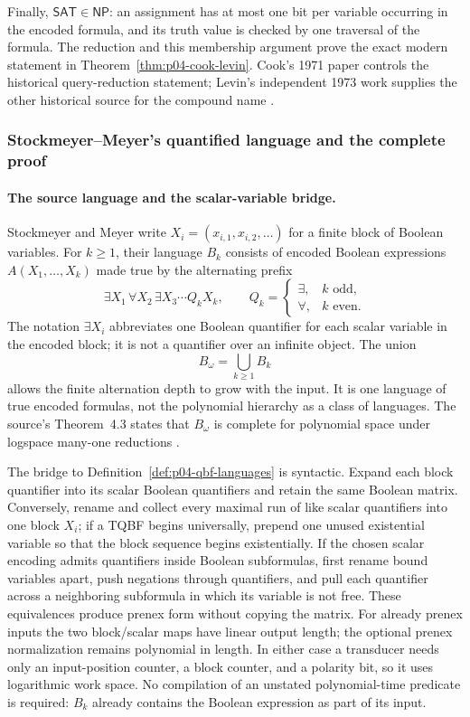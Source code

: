 Finally, \(\mathsf{SAT}\in\mathsf{NP}\): an assignment has at most one bit per
variable occurring in the encoded formula, and its truth value is checked by
one traversal of the formula.  The reduction and this membership argument
prove the exact modern statement in Theorem~\ref{thm:p04-cook-levin}.
Cook's 1971 paper controls the historical query-reduction statement; Levin's
independent 1973 work supplies the other historical source for the compound
name \cite{Cook1971,Levin1973,AroraBarak2009}.

\subsubsection{Stockmeyer--Meyer's quantified language and the complete proof}

\paragraph{The source language and the scalar-variable bridge.}
Stockmeyer and Meyer write
\(X_i=(x_{i,1},x_{i,2},\ldots)\) for a finite block of Boolean variables.  For
\(k\geq1\), their language \(B_k\) consists of encoded Boolean expressions
\(A(X_1,\ldots,X_k)\) made true by the alternating prefix
\[
 \exists X_1\,\forall X_2\,\exists X_3\cdots Q_kX_k,
 \qquad
 Q_k=
 \begin{cases}
  \exists,&k\text{ odd},\\
  \forall,&k\text{ even}.
 \end{cases}
\]
The notation \(\exists X_i\) abbreviates one Boolean quantifier for each scalar
variable in the encoded block; it is not a quantifier over an infinite object.
The union
\[
 B_\omega=\bigcup_{k\geq1}B_k
\]
allows the finite alternation depth to grow with the input.  It is one language
of true encoded formulas, not the polynomial hierarchy as a class of languages.
The source's Theorem~4.3 states that \(B_\omega\) is complete for polynomial
space under logspace many-one reductions
\cite[thm.~4.3]{StockmeyerMeyer1973}.

The bridge to Definition~\ref{def:p04-qbf-languages} is syntactic.  Expand each
block quantifier into its scalar Boolean quantifiers and retain the same Boolean
matrix.  Conversely, rename and collect every maximal run of like scalar
quantifiers into one block \(X_i\); if a TQBF begins universally, prepend one
unused existential variable so that the block sequence begins existentially.
If the chosen scalar encoding admits quantifiers inside Boolean subformulas,
first rename bound variables apart, push negations through quantifiers, and pull
each quantifier across a neighboring subformula in which its variable is not
free.  These equivalences produce prenex form without copying the matrix.
For already prenex inputs the two block/scalar maps have linear output length;
the optional prenex normalization remains polynomial in length.  In either
case a transducer needs only an input-position counter, a block counter, and a
polarity bit, so it uses logarithmic work space.  No compilation of an unstated
polynomial-time predicate is required: \(B_k\) already contains the Boolean
expression as part of its input.

